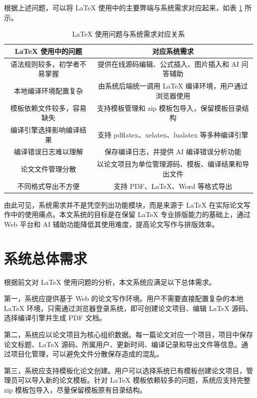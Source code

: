 \documentclass{xduugthesis}
\begin{document}
根据上述问题，可以将 LaTeX 使用中的主要弊端与系统需求对应起来，如表 \ref{tab:latex-problem-requirement} 所示。

\begin{table}[!ht]
    \centering
    \caption{LaTeX 使用问题与系统需求对应关系}
    \label{tab:latex-problem-requirement}
    \begin{tabular}{|c|c|}
        \hline
        LaTeX 使用中的问题 & 对应系统需求 \\
        \hline
        语法规则较多，初学者不易掌握 & 提供在线源码编辑、公式插入、图片插入和 AI 问答辅助 \\
        \hline
        本地编译环境配置复杂 & 由系统后端统一调用 LaTeX 编译环境，用户通过浏览器使用 \\
        \hline
        模板依赖文件较多，容易缺失 & 支持模板管理和 zip 模板包导入，保留模板目录结构 \\
        \hline
        编译引擎选择影响编译结果 & 支持 pdflatex、xelatex、lualatex 等多种编译引擎 \\
        \hline
        编译错误日志难以理解 & 保存编译日志，并提供 AI 编译错误分析功能 \\
        \hline
        论文文件管理分散 & 以论文项目为单位管理源码、模板、编译结果和导出文件 \\
        \hline
        不同格式导出不方便 & 支持 PDF、LaTeX、Word 等格式导出 \\
        \hline
    \end{tabular}
\end{table}

由此可见，系统需求并不是凭空列出功能模块，而是来源于 LaTeX 在实际论文写作中的使用痛点。本文系统的目标是在保留 LaTeX 专业排版能力的基础上，通过 Web 平台和 AI 辅助功能降低其使用难度，提高论文写作与排版效率。

\section{系统总体需求}
根据前文对 LaTeX 使用问题的分析，本文系统应满足以下总体需求。

第一，系统应提供基于 Web 的论文写作环境。用户不需要直接配置复杂的本地 LaTeX 环境，只需通过浏览器登录系统，即可创建论文项目、编辑 LaTeX 源码、选择编译引擎并生成 PDF 文档。

第二，系统应以论文项目为核心组织数据。每一篇论文对应一个项目，项目中保存论文标题、LaTeX 源码、所属用户、更新时间、编译记录和导出文件等信息。通过项目化管理，可以避免文件分散保存造成的混乱。

第三，系统应支持模板化论文创建。用户可以选择系统已有模板创建论文项目，管理员可以导入新的论文模板。针对 LaTeX 模板依赖较多的问题，系统应支持完整 zip 模板包导入，尽量保留模板原有目录结构。
\end{document}
